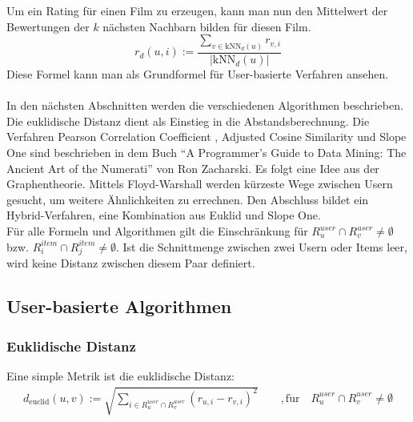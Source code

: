 Um ein Rating für einen Film zu erzeugen, kann man nun den Mittelwert der Bewertungen der $k$ nächsten Nachbarn bilden für diesen Film. 
\begin{equation}
r_{d}(u,i) := \dfrac{\sum\limits_{v \in \mathrm{kNN}_{d}(u)} r_{v,i}}{|\mathrm{kNN}_{d}(u)|}  
\label{rating}
\end{equation}
Diese Formel kann man als Grundformel für User-basierte Verfahren ansehen.\\\\
In den nächsten Abschnitten werden die verschiedenen Algorithmen beschrieben. Die euklidische Distanz dient als Einstieg in die Abstandsberechnung. Die Verfahren Pearson Correlation Coefficient \cite[Kap. 2, S.~23]{G2DM}, Adjusted Cosine Similarity \cite[Kap. 3, S.~16]{G2DM} und Slope One \cite[Kap. 3, S.~28]{G2DM} sind beschrieben in dem Buch "`A Programmer's Guide to Data Mining: The Ancient Art of the Numerati"' \cite{G2DM} von Ron Zacharski. Es folgt eine Idee aus der Graphentheorie. Mittels Floyd-Warshall werden kürzeste Wege zwischen Usern gesucht, um weitere Ähnlichkeiten zu errechnen. Den Abschluss bildet ein Hybrid-Verfahren, eine Kombination aus Euklid und Slope One.\\
Für alle Formeln und Algorithmen gilt die Einschränkung für $R^{user}_{u}\cap R^{user}_{v} \neq \emptyset$ bzw. $R^{item}_{i}\cap R^{item}_{j} \neq \emptyset$. Ist die Schnittmenge zwischen zwei Usern oder Items leer, wird keine Distanz zwischen diesem Paar definiert.

\subsection{User-basierte Algorithmen}
\subsubsection{Euklidische Distanz}\label{s.euclid}
Eine simple Metrik ist die euklidische Distanz:
	\begin{equation}
	\begin{aligned}
	d_{\mathrm{euclid}}(u,v) := \sqrt{\sum\limits_{i \in R^{user}_{u}\cap R^{user}_{v}} (r_{u,i}-r_{v,i})^2  }
	\qquad \mathrm{, f\ddot{u}r }\quad R^{user}_{u}\cap R^{user}_{v} \neq \emptyset
	\label{euclid}
	\end{aligned}
	\end{equation}

